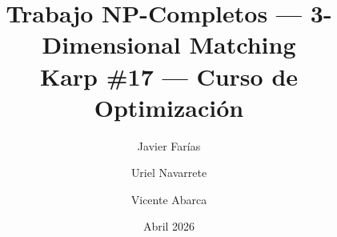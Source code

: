 \documentclass[11pt,a4paper]{article}
\title{Trabajo NP-Completos --- 3-Dimensional Matching\\[0.4em]
       \large Karp \#17 --- Curso de Optimización}
\author{Javier Farías \and Uriel Navarrete \and Vicente Abarca}
\date{Abril 2026}
\begin{document}
\maketitle
\tableofcontents
\bigskip











\end{document}
